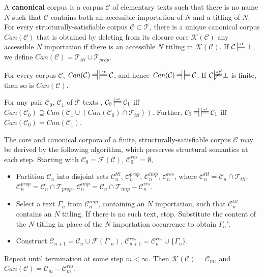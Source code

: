 \documentclass{IOS-Book-Article}
\newcommand{\corp}{ \mathcal{C} }
\newcommand{\texts}{ \mathcal{T} }
\newcommand{\ttl}{\mathit{ttl}}
\newcommand{\Formal}{\mathcal{F}}
\newcommand{\Core}{\mathcal{K}}
\newcommand{\Canon}{\mathit{Can}}
\newcommand{\prop}{\mathit{prop}}
\newcommand{\imp}{\mathit{imp}}
\newcommand{\res}{\mathit{res}}
\newcommand{\mdpfEquiv}{\ensuremath{\ndststile[ss]{\hspace*{3 pt }}{}\hspace*{3 pt}\sdtstile[ss]{}{}}}
\newcommand{\mdpfstruct}{\ensuremath{\sdtstile[ss]{}{st}}}
\newcommand{\mdpfstructEquiv}{\ensuremath{\ndststile[ss]{\hspace*{3 pt }}{}\hspace*{3 pt}\sdtstile[ss]{}{st}}}
\DeclareMathOperator*{\nmdpfstruct}{\cancel{\mdpfstruct}}
\begin{document}
\noindent A \textbf{canonical} corpus is a corpus $\corp$ of elementary texts such that 
there is no name $N$ such that $\corp$ contains both an accessible importation of $N$ and a titling of $N$.
For every structurally-satisfiable corpus $\corp\subset\texts$, there is a unique canonical corpus $\Canon(\corp)$ that is obtained by deleting from its closure core $\Core(\corp)$ any accessible $N$ importation if there is an accessible $N$ titling in $\Core(\corp)$. If $\corp\mdpfstruct\bot$, we define $\Canon(\corp) = \texts_\ttl \cup \texts_\prop$.

\begin{theo}
\label{canon0}
For every corpus $\corp$, $\Canon(\corp)\mdpfstructEquiv\corp$, and hence $\Canon(\corp)\mdpfEquiv\corp$.
If $\corp\nmdpfstruct\bot$ is finite, then so is $\Canon(\corp)$.
\end{theo}


\begin{theo}
\label{canon}
For any pair $\corp_0$, $\corp_1$ of $\texts$ texts , $\corp_0\mdpfstruct\corp_1$ iff $\Canon(\corp_0) \supseteq \Canon(\corp_1\cup (\Canon(\corp_0)\cap \texts_\ttl))$.
Further, $\corp_0\mdpfstructEquiv\corp_1$ iff $\Canon(\corp_0) = \Canon(\corp_1)$.
\end{theo}

\begin{theo}
\label{canonalgo}
The core and canonical corpora of a finite, structurally-satisfiable corpus $\corp$ may be derived by the following algorithm, which preserves structural semantics at each step. Starting with $\corp_0 = \Formal(\corp)$, $\corp^\res_0 = \emptyset$,
\begin{itemize}
\item Partition $\corp_n$ into disjoint sets $\corp^\ttl_n$, $\corp^\prop_n$, $\corp^\imp_n$, $\corp^\res_n$, where   $\corp^\ttl_n = \corp_n \cap \texts_\ttl$, $\corp^\prop_n = \corp_n \cap \texts_\prop$, $\corp^\imp_n = \corp_n \cap \texts_\imp - \corp^{res}_n$. 
\item Select a text $\Gamma_n$ from $\corp^\imp_n$, containing an $N$ importation, such that $\corp^\ttl_n$ contains an $N$ titling. If there is no such text, stop. Substitute the content of the $N$ titling in place of the $N$ importation occurrence to obtain $\Gamma_n'$.
\item Construct $\corp_{n+1} = \corp_n \cup \Formal(\Gamma'_n)$, $\corp^{res}_{n+1} = \corp^{res}_{n} \cup \{\Gamma_n\}$.
\end{itemize}
Repeat until termination at some step $m < \infty$. 
Then $\Core(\corp) = \corp_m$, and $\Canon(\corp) = \corp_m - \corp^\res_m$.
\end{theo}
\end{document}

